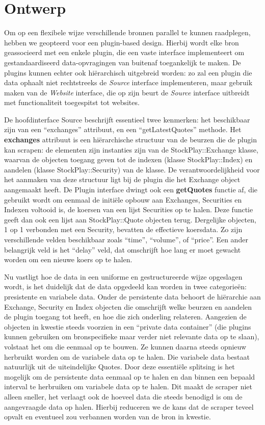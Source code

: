 \section{Ontwerp}

Om op een flexibele wijze verschillende bronnen parallel te kunnen raadplegen, hebben we geopteerd voor een plugin-based design. Hierbij wordt elke bron geassocieerd met een enkele plugin, die een vaste interface implementeert om gestandaardiseerd data-opvragingen van buitenaf toegankelijk te maken. De plugins kunnen echter ook hi\"erarchisch uitgebreid worden: zo zal een plugin die data ophaalt niet rechtstreeks de \emph{Source} interface implementeren, maar gebruik maken van de \emph{Website} interface, die op zijn beurt de \emph{Source} interface uitbreidt met functionaliteit toegespitst tot websites.

De hoofdinterface Source beschrijft essentieel twee kenmerken: het beschikbaar zijn van een ``exchanges'' attribuut, en een ``getLatestQuotes'' methode. Het \textbf{exchanges} attribuut is een hi\"erarchische structuur van de beurzen die de plugin kan scrapen: de elementen zijn instanties zijn van de StockPlay::Exchange klasse, waarvan de objecten toegang geven tot de indexen (klasse StockPlay::Index) en aandelen (klasse StockPlay::Security) van de klasse. De verantwoordelijkheid voor het aanmaken van deze structuur ligt bij de plugin die het Exchange object aangemaakt heeft.
De Plugin interface dwingt ook een \textbf{getQuotes} functie af, die gebruikt wordt om eenmaal de initi\"ele opbouw aan Exchanges, Securities en Indexen voltooid is, de koersen van een lijst Securities op te halen. Deze functie geeft dan ook een lijst aan StockPlay::Quote objecten terug. Dergelijke objecten, 1 op 1 verbonden met een Security, bevatten de effectieve koersdata. Zo zijn verschillende velden beschikbaar zoals ``time'', ``volume'', of ``price''. Een ander belangrijk veld is het ``delay'' veld, dat omschrijft hoe lang er moet gewacht worden om een nieuwe koers op te halen.

Nu vastligt hoe de data in een uniforme en gestructureerde wijze opgeslagen wordt, is het duidelijk dat de data opgedeeld kan worden in twee categorie\"en: presistente en variabele data.
Onder de persistente data behoort de hi\"erarchie aan Exchange, Security en Index objecten die omschrijft welke beurzen en aandelen de plugin toegang tot heeft, en hoe die zich onderling relateren. Aangezien de objecten in kwestie steeds voorzien in een ``private data container'' (die plugins kunnen gebruiken om bronspecifieke maar verder niet relevante data op te slaan), volstaat het om die eenmaal op te bouwen. Ze kunnen daarna steeds opnieuw herbruikt worden om de variabele data op te halen. Die variabele data bestaat natuurlijk uit de uiteindelijke Quotes.
Door deze essenti\"ele splitsing is het mogelijk om de persistente data eenmaal op te halen en dan binnen een bepaald interval te herbruiken om variabele data op te halen. Dit maakt de scraper niet alleen sneller, het verlaagt ook de hoeveel data die steeds benodigd is om de aangevraagde data op halen. Hierbij reduceren we de kans dat de scraper teveel opvalt en eventueel zou verbannen worden van de bron in kwestie.

